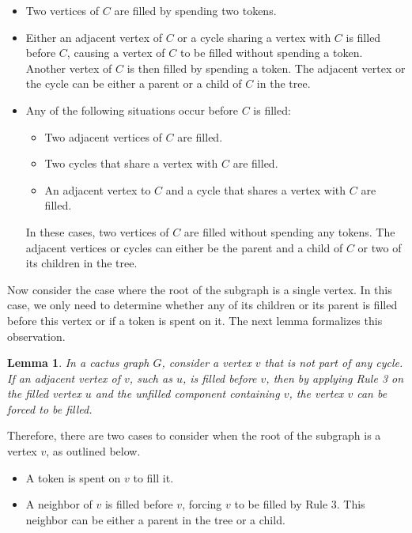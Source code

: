 \documentclass[11pt]{article}
\theoremstyle{plain}
\newtheorem{lemma}[theorem]{Lemma}
\theoremstyle{definition}
\theoremstyle{remark}
\begin{document}
\begin{itemize}
    \item Two vertices of $C$ are filled by spending two tokens.
    
    \item Either an adjacent vertex of $C$ or a cycle sharing a vertex with $C$ is filled before $C$, causing a vertex of $C$ to be filled without spending a token. Another vertex of $C$ is then filled by spending a token. The adjacent vertex or the cycle can be either a parent or a child of $C$ in the tree.
    
    \item Any of the following situations occur before $C$ is filled:  
    \begin{itemize}
        \item Two adjacent vertices of $C$ are filled.  
        \item Two cycles that share a vertex with $C$ are filled.  
        \item An adjacent vertex to $C$ and a cycle that shares a vertex with $C$ are filled.  
    \end{itemize}  
    In these cases, two vertices of $C$ are filled without spending any tokens. The adjacent vertices or cycles can either be the parent and a child of $C$ or two of its children in the tree.
\end{itemize}

Now consider the case where the root of the subgraph is a single vertex. In this case, we only need to determine whether any of its children or its parent is filled before this vertex or if a token is spent on it. The next lemma formalizes this observation.

\begin{lemma}
    In a cactus graph $G$, consider a vertex $v$ that is not part of any cycle. If an adjacent vertex of $v$, such as $u$, is filled before $v$, then by applying Rule 3 on the filled vertex $u$ and the unfilled component containing $v$, the vertex $v$ can be forced to be filled.
\end{lemma}

Therefore, there are two cases to consider when the root of the subgraph is a vertex $v$, as outlined below.

\begin{itemize}
    \item A token is spent on $v$ to fill it.
    \item A neighbor of $v$ is filled before $v$, forcing $v$ to be filled by Rule 3. This neighbor can be either a parent in the tree or a child.
\end{itemize}
\end{document}
